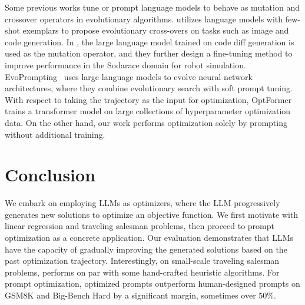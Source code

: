 Some previous works tune or prompt language models to behave as mutation and crossover operators in evolutionary algorithms.
\citet{meyerson2023language} utilizes language models with few-shot exemplars to propose evolutionary cross-overs on tasks such as image and code generation.
In \citet{lehman2022evolution}, the large language model trained on code diff generation is used as the mutation operator, and they further design a fine-tuning method to improve performance in the Sodarace domain for robot simulation.
EvoPrompting~\citep{chen2023evoprompting} uses large language models to evolve neural network architectures, where they combine evolutionary search with soft prompt tuning.
With respect to taking the trajectory as the input for optimization, OptFormer~\citep{chen2022towards} trains a transformer model on large collections of hyperparameter optimization data.
On the other hand, our work performs optimization solely by prompting without additional training.

\section{Conclusion}
\label{sec:conclusion}
We embark on employing LLMs as optimizers, where the LLM progressively generates new solutions to optimize an objective function.
We first motivate \name{} with linear regression and traveling salesman problems, then proceed to prompt optimization as a concrete application.
Our evaluation demonstrates that LLMs have the capacity of gradually improving the generated solutions based on the past optimization trajectory.
Interestingly, on small-scale traveling salesman problems, \name{} performs on par with some hand-crafted heuristic algorithms.
For prompt optimization, optimized prompts outperform human-designed prompts on GSM8K and Big-Bench Hard by a significant margin, sometimes over $50\%$.

